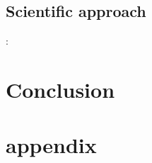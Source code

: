 \documentclass{article}
\begin{document}
\subsection{Scientific approach} : 

\section{Conclusion }

\section{appendix }
\end{document}
